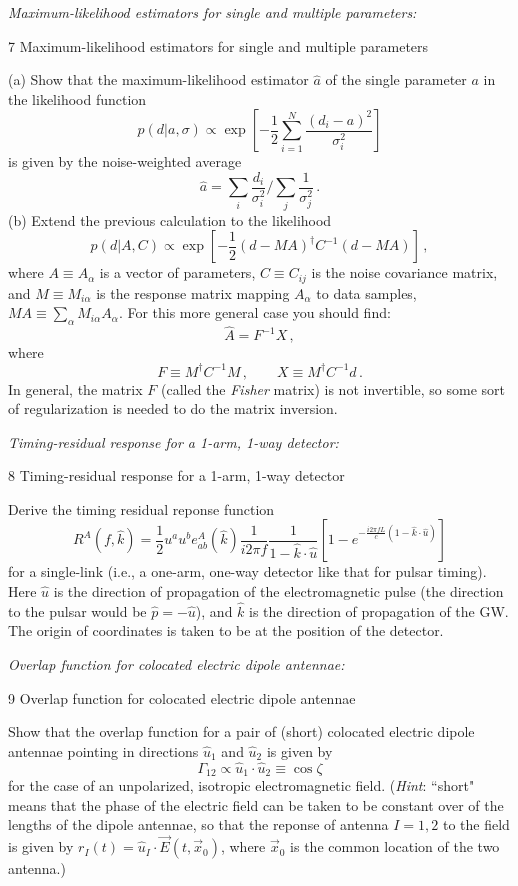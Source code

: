 \documentclass[11pt]{article}
\def\be{\begin{equation}}
\def\ee{\end{equation}}
\def\i{\item{}}
\begin{document}
\i {\em Maximum-likelihood estimators for single and multiple
parameters:}
{7 Maximum-likelihood estimators for single and multiple
parameters}

(a) Show that the maximum-likelihood estimator $\hat a$ of 
the single parameter $a$ in the likelihood function
\be
p(d|a, \sigma) \propto
\exp\left[-\frac{1}{2}\sum_{i=1}^N \frac{(d_i-a)^2}{\sigma_i^2}\right]
\ee
%
is given by the noise-weighted average
%
\be
\hat a={\sum_i \frac{d_i}{\sigma_i^2}}\bigg/{\sum_j \frac{1}{\sigma_j^2}}\,.
\ee
%
(b) Extend the previous calculation to the likelihood
\be
p(d|A, C) \propto
\exp\left[-\frac{1}{2}(d-MA)^\dagger C^{-1} (d-MA)\right]\,,
\ee
%
where $A\equiv A_\alpha$ is a vector of parameters,
$C\equiv C_{ij}$ is the noise covariance matrix, and 
$M\equiv M_{i\alpha}$ is the response matrix mapping 
$A_\alpha$ to data samples, $MA\equiv \sum_\alpha M_{i\alpha}A_\alpha$.
For this more general case you should find:
%
\be
\hat A = F^{-1} X\,,
\ee
%
where
%
\be
F \equiv M^\dagger C^{-1} M\,,\qquad
X \equiv M^\dagger C^{-1} d\,.
\ee
%
In general, the matrix $F$ (called the {\em Fisher} matrix)
is not invertible, so some sort of regularization is needed
to do the matrix inversion.

\i {\em Timing-residual response for a 1-arm, 1-way detector:}
{8 Timing-residual response for a 1-arm, 1-way detector}

Derive the timing residual reponse function
%
\be
R^A(f,\hat k) = 
\frac{1}{2}u^a u^b e^A_{ab}(\hat k)
\frac{1}{i2\pi f}
\frac{1}{1-\hat k\cdot \hat u}
\left[1-e^{-\frac{i2\pi fL}{c}(1-\hat k\cdot\hat u)}\right]
\ee
%
for a single-link (i.e., a one-arm, one-way detector like 
that for pulsar timing).
Here $\hat u$ is the direction of propagation of the
electromagnetic pulse (the direction to the pulsar
would be $\hat p=-\hat u$), and $\hat k$ is the direction 
of propagation of the GW.
The origin of coordinates is taken to be at the position 
of the detector.

\i {\em Overlap function for colocated electric dipole antennae:}
{9 Overlap function for colocated electric dipole antennae}

Show that the overlap function for a pair of (short)
colocated electric dipole antennae pointing in directions 
$\hat u_1$ and $\hat u_2$ is given by 
%
\be
\Gamma_{12} 
\propto
\hat u_1\cdot\hat u_2 
\equiv\cos\zeta
\ee
% 
for the case of an unpolarized, isotropic electromagnetic field.
({\em Hint}: ``short" means that the phase of the electric 
field can be taken to be constant over of the lengths of 
the dipole antennae, 
so that the reponse of antenna $I=1,2$ to the field is
given by $r_I(t)=\hat u_I\cdot\vec E(t, \vec x_0)$, where
$\vec x_0$ is the common location of the two antenna.)
 
\end{document}
